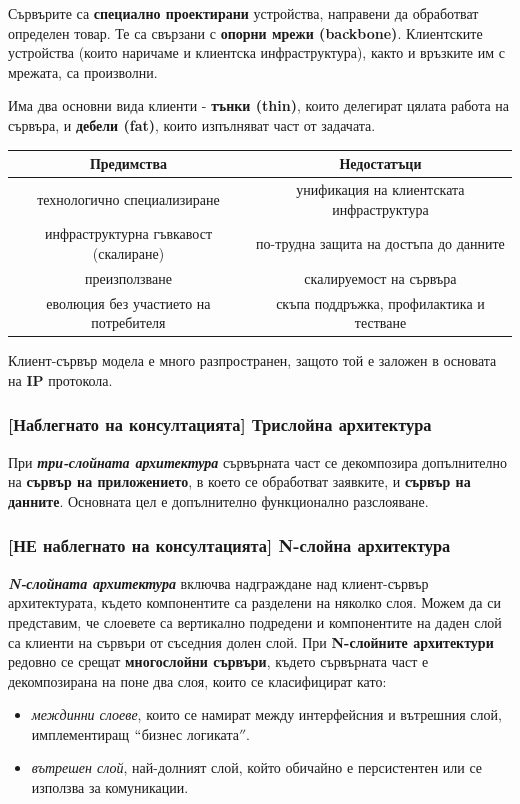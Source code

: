 \documentclass[fleqn,12pt]{article}
\begin{document}
Сървърите са \textbf{специално проектирани} устройства, направени да обработват определен товар. Те са свързани с \textbf{опорни мрежи (backbone)}.
Клиентските устройства (които наричаме и клиентска инфраструктура), както и връзките им с мрежата, са произволни.

Има два основни вида клиенти - \textbf{тънки (thin)}, които делегират цялата работа на сървъра, и \textbf{дебели (fat)}, които изпълняват част от задачата.

\begin{center}
\begin{tabular}{ |c|c| } 
    \hline
    Предимства & Недостатъци \\
    \hline
    технологично специализиране & унификация на клиентската инфраструктура \\
    \hline
    инфраструктурна гъвкавост (скалиране) & по-трудна защита на достъпа до данните \\
    \hline
    преизползване & скалируемост на сървъра \\
    \hline
    еволюция без участието на потребителя & скъпа поддръжка, профилактика и тестване \\
    \hline
\end{tabular}
\end{center}

Клиент-сървър модела е много разпространен, защото той е заложен в основата на \textbf{IP} протокола.

\subsubsection{[Наблегнато на консултацията] Трислойна  архитектура}
При \textbf{\textit{три-слойната архитектура}} сървърната част се декомпозира допълнително 
на \textbf{сървър на приложението}, в което се обработват заявките, и \textbf{сървър на данните}.
Основната цел е допълнително функционално разслояване.

\subsubsection{[НЕ наблегнато на консултацията] N-слойна архитектура}
\textbf{\textit{N-слойната архитектура}} включва надграждане над клиент-сървър архитектурата, където компонентите са разделени на няколко слоя.
Можем да си представим, че слоевете са вертикално подредени и компонентите на даден слой са клиенти на сървъри от съседния долен слой.
\bigbreak
При \textbf{N-слойните архитектури} редовно се срещат \textbf{многослойни сървъри}, където сървърната част е декомпозирана на поне два слоя, които се класифицират като:
\begin{itemize}
    \item \textit{междинни слоеве}, които се намират между интерфейсния и вътрешния слой, имплементиращ $``$бизнес логиката$''$.
    \item \textit{вътрешен слой}, най-долният слой, който обичайно е персистентен или се използва за комуникации. 
\end{itemize}
\end{document}
